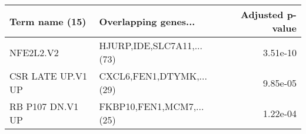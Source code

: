 \begin{tabular}{llr}
\toprule
   Term name (15) &      Overlapping genes... &  Adjusted p-value \\
\midrule
        NFE2L2.V2 & HJURP,IDE,SLC7A11,...(73) &          3.51e-10 \\
CSR LATE UP.V1 UP &  CXCL6,FEN1,DTYMK,...(29) &          9.85e-05 \\
 RB P107 DN.V1 UP &  FKBP10,FEN1,MCM7,...(25) &          1.22e-04 \\
\bottomrule
\end{tabular}
